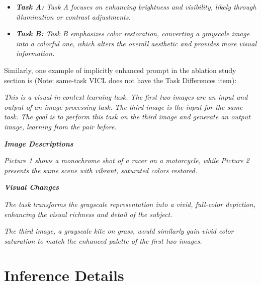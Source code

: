 \begin{tcolorbox}[colback=gray!20, colframe=gray!20, boxrule=0pt, left=3pt, right=3pt, top=3pt, bottom=3pt]
\begin{itemize}

\item \emph{\textbf{Task A:} Task A focuses on enhancing brightness and visibility, likely through illumination or contrast adjustments.}

\item \emph{\textbf{Task B:} Task B emphasizes color restoration, converting a grayscale image into a colorful one, which alters the overall aesthetic and provides more visual information.}

\end{itemize}

\end{tcolorbox}

\noindent Similarly, one example of implicitly enhanced prompt in the ablation study section is (Note: same-task VICL does not have the Task Differences item):

\begin{tcolorbox}[colback=gray!20, colframe=gray!20, boxrule=0pt, left=3pt, right=3pt, top=3pt, bottom=3pt]

\emph{This is a visual in-context learning task. The first two images are an input and output of an image processing task. The third image is the input for the same task. The goal is to perform this task on the third image and generate an output image, learning from the pair before.}

\end{tcolorbox}

\begin{tcolorbox}[colback=gray!20, colframe=gray!20, boxrule=0pt, left=3pt, right=3pt, top=3pt, bottom=3pt]

\emph{\textbf{Image Descriptions}}

\emph{Picture 1 shows a monochrome shot of a racer on a motorcycle, while Picture 2 presents the same scene with vibrant, saturated colors restored.}

\emph{\textbf{Visual Changes}}

\emph{The task transforms the grayscale representation into a vivid, full-color depiction, enhancing the visual richness and detail of the subject.}

\emph{The third image, a grayscale kite on grass, would similarly gain vivid color saturation to match the enhanced palette of the first two images.}

\end{tcolorbox}


\section{Inference Details}
\label{sec:infer}

